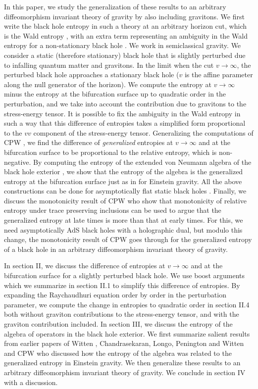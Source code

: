 \documentclass[12pt]{article}
\begin{document}
In this paper, we study the generalization of these results to an arbitrary diffeomorphism invariant theory of gravity by also including gravitons. We first write the  black hole entropy in such a theory at an arbitrary horizon cut, which is the Wald entropy \cite{Wald}, \cite{VR} with an extra term representing an ambiguity in the Wald entropy for a non-stationary black hole \cite{JKM}. We work in semiclassical gravity. We consider a static (therefore stationary) black hole that is slightly perturbed due to infalling quantum matter and gravitons. In the limit when the cut $v \to \infty$, the perturbed black hole approaches a stationary black hole ($v$ is the affine parameter along the null generator of the horizon). We compute the entropy at $v \to \infty$ minus the entropy at the bifurcation surface up to quadratic order in the perturbation, and we take into account the contribution due to gravitons to the stress-energy tensor. It is possible to fix the ambiguity in the Wald entropy in such a way that this difference of entropies takes a simplified form proportional to the $vv$ component of the stress-energy tensor. Generalizing the computations of CPW \cite{VGE}, we find the difference of \emph{generalized} entropies at $v \to \infty $ and at the bifurcation surface to be proportional to the relative entropy, which is non-negative. By computing the entropy of the extended von Neumann algebra of the black hole exterior \cite{EW3}, we show that the entropy of the algebra is the generalized entropy at the bifurcation surface just as in \cite{VGE} for Einstein gravity. All the above constructions can be done for asymptotically flat static black holes \cite{VRGE}. Finally, we discuss the monotonicity result of CPW \cite{VGE} who show that monotonicity of relative entropy under trace preserving inclusions can be used to argue that the generalized entropy at late times is more than that at early times. For this, we need asymptotically AdS black holes with a holographic dual, but modulo this change, the monotonicity result of CPW goes through for the generalized entropy of a black hole in an arbitrary diffeomorphism invariant theory of gravity.

In section II, we discuss the difference of entropies at $v \to \infty$ and at the bifurcation surface for a slightly perturbed black hole. We use boost arguments which we summarize in section II.1 to simplify this difference of entropies. By expanding the Raychaudhuri equation order by order in the perturbation parameter, we compute the change in entropies to quadratic order in section II.4 both without graviton contributions to the stress-energy tensor, and with the graviton contribution included. In section III, we discuss the entropy of the algebra of operators in the black hole exterior. We first summarize salient results from earlier papers of Witten \cite{EW3}, Chandrasekaran, Longo, Penington and Witten \cite{VRGE} and CPW \cite{VGE} who discussed how the entropy of the algebra was related to the generalized entropy in Einstein gravity. We then generalize these results to an arbitrary diffeomorphism invariant theory of gravity. We conclude in section IV with a discussion.
\end{document}
